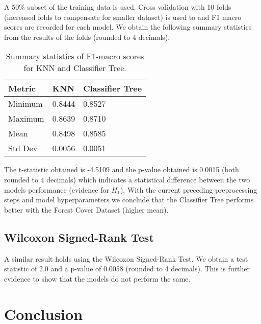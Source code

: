 \documentclass[conference]{IEEEtran}
\begin{document}
A 50\% subset of the training data is used. Cross validation with 10 folds (increased folds to compensate for smaller dataset) is used to and F1 macro scores are recorded for each model. We obtain the following summary statistics from the results of the folds (rounded to 4 decimals).

\begin{table}[htbp]
	\centering
	\caption{Summary statistics of F1-macro scores for KNN and Classifier Tree.}
	\vspace{1mm}
	\begin{tabular}{lll}
		\toprule
		\textbf{Metric} & \textbf{KNN} & \textbf{Classifier Tree} \\
		\midrule
		Minimum    & 0.8444 & 0.8527 \\
		Maximum    & 0.8639 & 0.8710 \\
		Mean       & 0.8498 & 0.8585 \\
		Std Dev    & 0.0056 & 0.0051 \\
		\bottomrule
	\end{tabular}
	\label{tab:f1_summary}
\end{table}


The t-statistic obtained is -4.5109 and the p-value obtained is 0.0015 (both rounded to 4 decimals) which indicates a statistical difference between the two models performance (evidence for $H_1$). With the current preceding preprocessing steps and model hyperparameters we conclude that the Classifier Tree performs better with the Forest Cover Dataset (higher mean).

\subsection{Wilcoxon Signed-Rank Test}

A similar result holds using the Wilcoxon Signed-Rank Test. We obtain a test statistic of 2.0 and a p-value of 0.0058 (rounded to 4 decimals). This is further evidence to show that the models do not perform the same.


\section{Conclusion}
\end{document}
